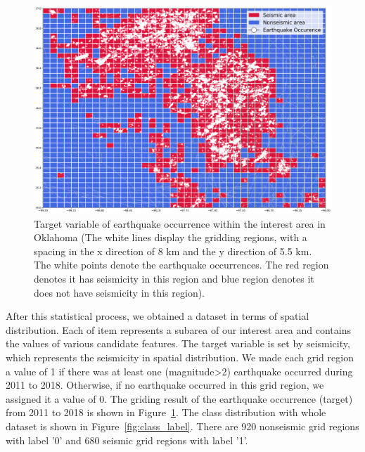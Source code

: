 \documentclass[final-report]{report-template}
\begin{document}



\begin{figure}
    \begin{center}
        \includegraphics[width=1\textwidth]{target_mapping.png}
    \end{center}
    \caption{\label{fig:target_mapping} Target variable of earthquake occurrence within the interest area in Oklahoma (The white lines display the gridding regions, with a spacing in the x direction of 8 km and the y direction of 5.5 km. The white points denote the earthquake occurrences.
    The red region denotes it has seismicity in this region and blue region denotes it does not have seismicity in this region).}
\end{figure}
After this statistical process, we obtained a dataset in terms of spatial distribution. Each of item represents a subarea of our interest area and contains the values of various candidate features.
The target variable is set by seismicity, which represents the seismicity in spatial distribution. We made each grid region a value of 1 if there was at least one (magnitude\textgreater2) earthquake occurred during 2011 to 2018. 
Otherwise, if no earthquake occurred in this grid region, we assigned it a value of 0. The griding result of the earthquake occurrence (target) from 2011 to 2018 is shown in Figure~\ref{fig:target_mapping}. 
The class distribution with whole dataset is shown in Figure~\ref{fig:class_label}. There are 920 nonseismic grid regions with label '0' and 680 seismic grid regions with label '1'.
\end{document}
